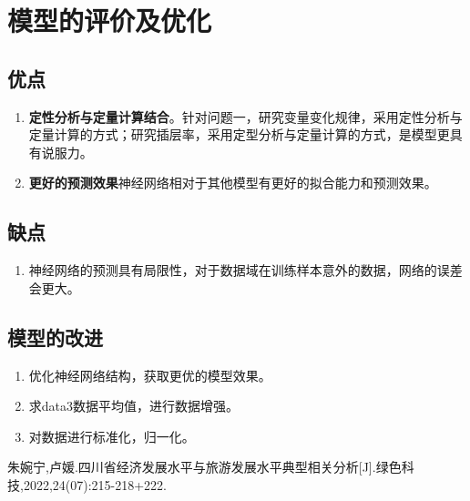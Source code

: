\documentclass[withoutpreface,bwprint]{cumcmthesis} %
\begin{document}
	
	
\section{模型的评价及优化}
\subsection{优点}
\begin{enumerate}
	\item  \textbf{定性分析与定量计算结合}。针对问题一，研究变量变化规律，采用定性分析与定量计算的方式；研究插层率，采用定型分析与定量计算的方式，是模型更具有说服力。
	
	\item \textbf{更好的预测效果}神经网络相对于其他模型有更好的拟合能力和预测效果。
	

\end{enumerate}

\subsection{缺点}
\begin{enumerate}
	\item 神经网络的预测具有局限性，对于数据域在训练样本意外的数据，网络的误差会更大。
\end{enumerate}
\subsection{模型的改进}
\begin{enumerate}
	\item 优化神经网络结构，获取更优的模型效果。
	\item 求data3数据平均值，进行数据增强。
	\item 对数据进行标准化，归一化。
\end{enumerate}


\begin{thebibliography}{9}%
    朱婉宁,卢媛.四川省经济发展水平与旅游发展水平典型相关分析[J].绿色科技,2022,24(07):215-218+222.
\end{thebibliography}

\newpage
\end{document}
